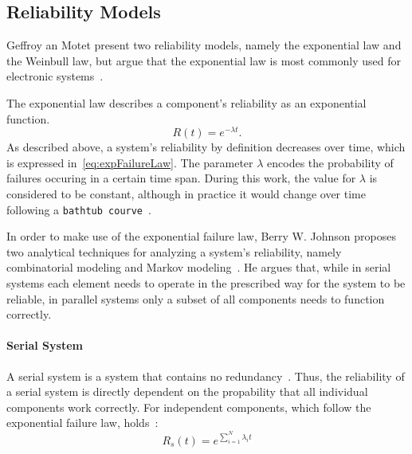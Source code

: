 \subsection{Reliability Models}
Geffroy an Motet present two reliability models, namely the exponential law and the Weinbull law, but argue that the exponential law is most commonly used for electronic systems~\cite{GeffroyMotetDependableComputing}.

The exponential law describes a component's reliability as an exponential function.
\begin{equation}
R(t) = e^{-\lambda t}.
\label{eq:expFailureLaw}
\end{equation}
As described above, a system's reliability by definition decreases over time, which is expressed in~\autoref{eq:expFailureLaw}.
The parameter $\lambda$ encodes the probability of failures occuring in a certain time span.
During this work, the value for $\lambda$ is considered to be constant, although in practice it would change over time following a \texttt{bathtub courve}~\cite{GeffroyMotetDependableComputing}.

In order to make use of the exponential failure law, Berry W. Johnson proposes two analytical techniques for analyzing a system's reliability, namely combinatorial modeling and Markov modeling~\cite{BarryFaultToleranceAnalysis}.
He argues that, while in serial systems each element needs to operate in the prescribed way for the system to be reliable, in parallel systems only a subset of all components needs to function correctly.

\paragraph{Serial System}
A serial system is a system that contains no redundancy~\cite{BarryFaultToleranceAnalysis}.
Thus, the reliability of a serial system is directly dependent on the propability that all individual components work correctly.
For independent components, which follow the exponential failure law, holds~\cite{BarryFaultToleranceAnalysis}:
\begin{equation}
R_s(t) = e^{\sum_{i = 1}^N \lambda_i t}
\label{eq:combReliabSerial}
\end{equation}

